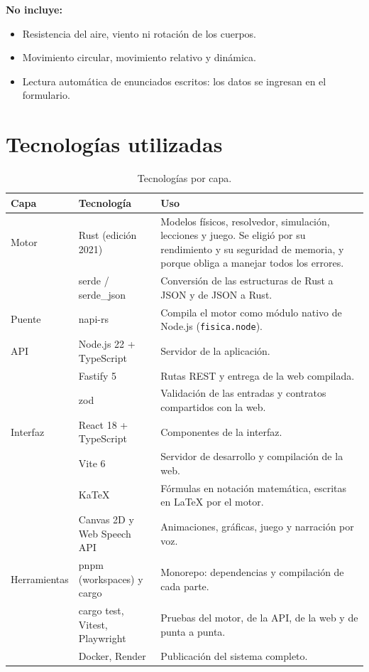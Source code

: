 \documentclass[11pt,letterpaper]{article}
\begin{document}
\textbf{No incluye:}
\begin{itemize}
  \item Resistencia del aire, viento ni rotación de los cuerpos.
  \item Movimiento circular, movimiento relativo y dinámica.
  \item Lectura automática de enunciados escritos: los datos se ingresan en el formulario.
\end{itemize}

\section{Tecnologías utilizadas}

\begin{table}[H]
\centering
\small
\begin{tabularx}{\linewidth}{@{}llX@{}}
\toprule
\textbf{Capa} & \textbf{Tecnología} & \textbf{Uso} \\
\midrule
Motor & Rust (edición 2021) & Modelos físicos, resolvedor, simulación, lecciones y juego. Se eligió por su rendimiento y su seguridad de memoria, y porque obliga a manejar todos los errores. \\
 & serde / serde\_json & Conversión de las estructuras de Rust a JSON y de JSON a Rust. \\
Puente & napi-rs & Compila el motor como módulo nativo de Node.js (\texttt{fisica.node}). \\
API & Node.js 22 + TypeScript & Servidor de la aplicación. \\
 & Fastify 5 & Rutas REST y entrega de la web compilada. \\
 & zod & Validación de las entradas y contratos compartidos con la web. \\
Interfaz & React 18 + TypeScript & Componentes de la interfaz. \\
 & Vite 6 & Servidor de desarrollo y compilación de la web. \\
 & KaTeX & Fórmulas en notación matemática, escritas en \LaTeX{} por el motor. \\
 & Canvas 2D y Web Speech API & Animaciones, gráficas, juego y narración por voz. \\
Herramientas & pnpm (workspaces) y cargo & Monorepo: dependencias y compilación de cada parte. \\
 & cargo test, Vitest, Playwright & Pruebas del motor, de la API, de la web y de punta a punta. \\
 & Docker, Render & Publicación del sistema completo. \\
\bottomrule
\end{tabularx}
\caption{Tecnologías por capa.}
\end{table}
\end{document}
